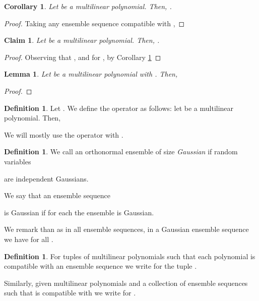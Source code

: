 \documentclass{daj}
\newcommand{\1}{\mathbbm{1}}
\theoremstyle{plain}
\newtheorem{lemma}[theorem]{Lemma}
\newtheorem{corollary}[theorem]{Corollary}
\newtheorem{claim}[theorem]{Claim}
\theoremstyle{definition}
\newtheorem{definition}[theorem]{Definition}
\begin{document}
\begin{corollary}
\label{cor:orthogonal-esquared}
Let  be a multilinear polynomial.
Then, .
\end{corollary}
\begin{proof}
Taking any ensemble sequence  compatible with ,

\end{proof}

\begin{claim}
\label{cl:orthogonal-variance}
Let  be a multilinear polynomial. Then, 
.
\end{claim}
\begin{proof}
Observing that , 
and  for , by Corollary
\ref{cor:orthogonal-esquared}

\end{proof}

\begin{lemma}
\label{lem:influence-vs-variance}
Let  be a multilinear polynomial with . Then,

\end{lemma}
\begin{proof}

\end{proof}

\begin{definition}
\label{def:t-rho}
Let . We define the operator  as follows:
let  be a multilinear 
polynomial. Then,

\end{definition}

We will mostly use the operator  with .

\begin{definition}
\label{def:gaussian-ensemble}
We call an orthonormal ensemble  of size 
\emph{Gaussian} if random variables 

are independent  Gaussians.

We say that an ensemble sequence
 
is Gaussian if for each  the ensemble 
is Gaussian.
\end{definition}

We remark than as in all ensemble sequences, in a Gaussian ensemble sequence
we have  for all .

\begin{definition}
For tuples of multilinear polynomials 
such that each polynomial  is 
compatible with an ensemble sequence  we write
 for the tuple 
.

Similarly, given multilinear polynomials 
 and a collection of ensemble
sequences
 such that
 is compatible with  we write
 for
.
\end{definition}
\end{document}
